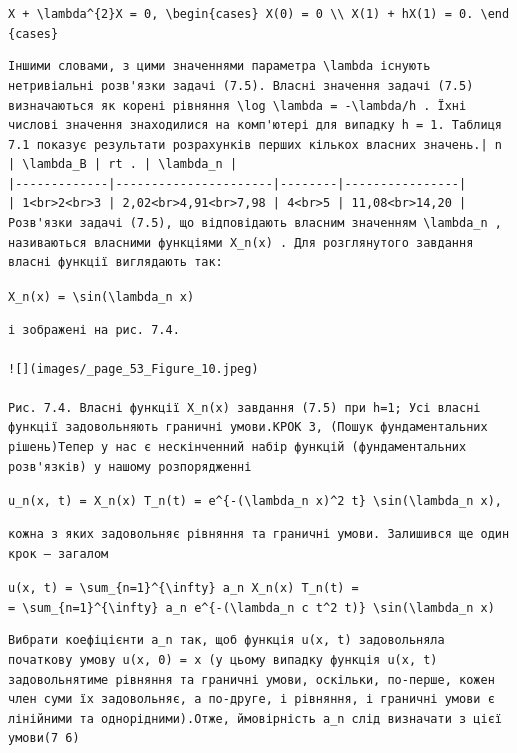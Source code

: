 \documentclass[
  ukrainian,
]{article}
\begin{document}
\texttt{X\textquotesingle{}\textquotesingle{}\ +\ \textbackslash{}lambda\^{}\{2\}X\ =\ 0,\ \textbackslash{}begin\{cases\}\ X(0)\ =\ 0\ \textbackslash{}\textbackslash{}\ X\textquotesingle{}(1)\ +\ hX(1)\ =\ 0.\ \textbackslash{}end\{cases\}}

\begin{verbatim}
Іншими словами, з цими значеннями параметра \lambda існують нетривіальні розв'язки задачі (7.5). Власні значення задачі (7.5) визначаються як корені рівняння \log \lambda = -\lambda/h . Їхні числові значення знаходилися на комп'ютері для випадку h = 1. Таблиця 7.1 показує результати розрахунків перших кількох власних значень.| n | \lambda_B | rt . | \lambda_n |
|-------------|----------------------|--------|----------------|
| 1<br>2<br>3 | 2,02<br>4,91<br>7,98 | 4<br>5 | 11,08<br>14,20 |Розв'язки задачі (7.5), що відповідають власним значенням \lambda_n , називаються власними функціями X_n(x) . Для розглянутого завдання власні функції виглядають так:
\end{verbatim}

\texttt{X\_n(x)\ =\ \textbackslash{}sin(\textbackslash{}lambda\_n\ x)}

\begin{verbatim}
і зображені на рис. 7.4.

![](images/_page_53_Figure_10.jpeg)

Рис. 7.4. Власні функції X_n(x) завдання (7.5) при h=1; Усі власні функції задовольняють граничні умови.КРОК 3, (Пошук фундаментальних рішень)Тепер у нас є нескінченний набір функцій (фундаментальних розв'язків) у нашому розпорядженні
\end{verbatim}

\texttt{u\_n(x,\ t)\ =\ X\_n(x)\ T\_n(t)\ =\ e\^{}\{-(\textbackslash{}lambda\_n\ x)\^{}2\ t\}\ \textbackslash{}sin(\textbackslash{}lambda\_n\ x),}

\begin{verbatim}
кожна з яких задовольняє рівняння та граничні умови. Залишився ще один крок — загалом
\end{verbatim}

\texttt{u(x,\ t)\ =\ \textbackslash{}sum\_\{n=1\}\^{}\{\textbackslash{}infty\}\ a\_n\ X\_n(x)\ T\_n(t)\ =}
\texttt{=\ \textbackslash{}sum\_\{n=1\}\^{}\{\textbackslash{}infty\}\ a\_n\ e\^{}\{-(\textbackslash{}lambda\_n\ c\ t\^{}2\ t)\}\ \textbackslash{}sin(\textbackslash{}lambda\_n\ x)}

\begin{verbatim}
Вибрати коефіцієнти a_n так, щоб функція u(x, t) задовольняла початкову умову u(x, 0) = x (у цьому випадку функція u(x, t) задовольнятиме рівняння та граничні умови, оскільки, по-перше, кожен член суми їх задовольняє, а по-друге, і рівняння, і граничні умови є лінійними та однорідними).Отже, ймовірність a_n слід визначати з цієї умови(7 6)
\end{verbatim}
\end{document}
